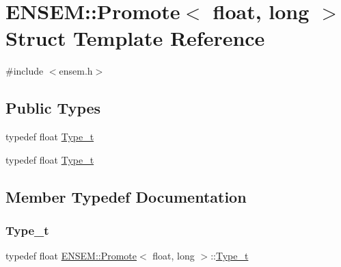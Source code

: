 \hypertarget{structENSEM_1_1Promote_3_01float_00_01long_01_4}{}\section{E\+N\+S\+EM\+:\+:Promote$<$ float, long $>$ Struct Template Reference}
\label{structENSEM_1_1Promote_3_01float_00_01long_01_4}


{\ttfamily \#include $<$ensem.\+h$>$}

\subsection*{Public Types}
\begin{DoxyCompactItemize}
\item 
typedef float \mbox{\hyperlink{structENSEM_1_1Promote_3_01float_00_01long_01_4_ab0b76c324678abb784e8e19c41e172c0}{Type\+\_\+t}}
\item 
typedef float \mbox{\hyperlink{structENSEM_1_1Promote_3_01float_00_01long_01_4_ab0b76c324678abb784e8e19c41e172c0}{Type\+\_\+t}}
\end{DoxyCompactItemize}


\subsection{Member Typedef Documentation}
\mbox{\label{structENSEM_1_1Promote_3_01float_00_01long_01_4_ab0b76c324678abb784e8e19c41e172c0}} 
\subsubsection{\texorpdfstring{Type\_t}{Type\_t}\hspace{0.1cm}{\footnotesize\ttfamily [1/2]}}
{\footnotesize\ttfamily typedef float \mbox{\hyperlink{structENSEM_1_1Promote}{E\+N\+S\+E\+M\+::\+Promote}}$<$ float, long $>$\+::\mbox{\hyperlink{structENSEM_1_1Promote_3_01float_00_01long_01_4_ab0b76c324678abb784e8e19c41e172c0}{Type\+\_\+t}}}

\mbox{\label{structENSEM_1_1Promote_3_01float_00_01long_01_4_ab0b76c324678abb784e8e19c41e172c0}} 
